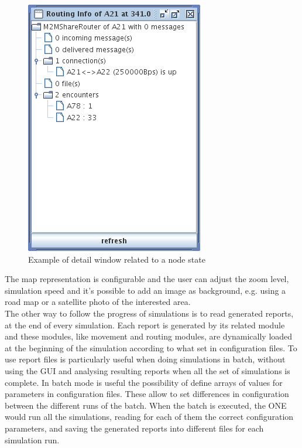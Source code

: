 \begin{figure}[htpb]
  \begin{center}
    \includegraphics[scale=0.6]{2-simulatore/img/Routing-Info.png}
    \caption[Routing Info]{Example of detail window related to a node state}    
    \label{Routing-Info}
  \end{center}
\end{figure}

The map representation is configurable and the user can adjust the zoom level, simulation speed and it's possible to add an image as background, e.g. using a road map or a satellite photo of the interested area.
\\

The other way to follow the progress of simulations is to read generated reports, at the end of every simulation. Each report is generated by its related module and these modules, like movement and routing modules, are dynamically loaded at the beginning of the simulation according to what set in configuration files. To use report files is particularly useful when doing simulations in batch, without using the GUI and analysing resulting reports when all the set of simulations is complete. In batch mode is useful the possibility of define arrays of values for parameters in configuration files. These allow to set differences in configuration between the different runs of the batch. When the batch is executed, the ONE would run all the simulations, reading for each of them the correct configuration parameters, and saving the generated reports into different files for each simulation run.
\\

